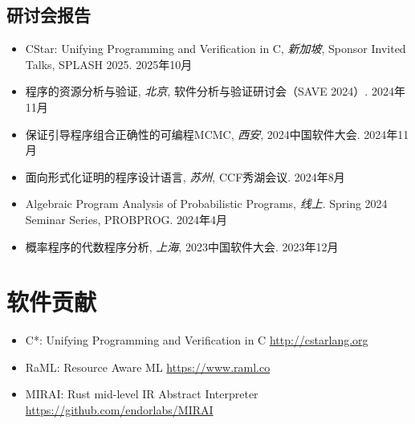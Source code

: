 \documentclass[11pt,letterpaper,sans]{moderncv}
\begin{document}
\subsection{研讨会报告}

\begin{itemize}
  \item {CStar: Unifying Programming and Verification in C}, \emph{新加坡}, Sponsor Invited Talks, SPLASH 2025. \hfill 2025年10月
  \item {程序的资源分析与验证}, \emph{北京}, 软件分析与验证研讨会（SAVE 2024）. \hfill 2024年11月
  \item {保证引导程序组合正确性的可编程MCMC}, \emph{西安}, 2024中国软件大会. \hfill 2024年11月
  \item {面向形式化证明的程序设计语言}, \emph{苏州}, CCF秀湖会议. \hfill 2024年8月
  \item {Algebraic Program Analysis of Probabilistic Programs}, \emph{线上}. Spring 2024 Seminar Series, PROBPROG. \hfill 2024年4月
  \item {概率程序的代数程序分析}, \emph{上海}, 2023中国软件大会. \hfill 2023年12月
\end{itemize}

\section{软件贡献}
\begin{itemize}
\item C*: Unifying Programming and Verification in C \hfill \url{http://cstarlang.org}
\item RaML: Resource Aware ML \hfill \url{https://www.raml.co}
\item MIRAI: Rust mid-level IR Abstract Interpreter \hfill \url{https://github.com/endorlabs/MIRAI}
\end{itemize}
\end{document}

